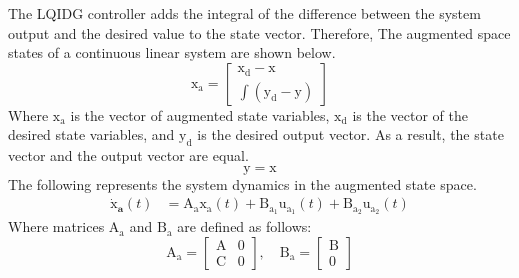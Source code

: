 \documentclass[conference]{IEEEtran}
\begin{document}
The LQIDG controller adds the integral of the difference between the system output and the desired value to the state vector.
Therefore, The augmented space states of a continuous linear system are shown below.
\begin{equation}\label{lqidg_x}
    \boldsymbol{\mathrm{x_a}} = \begin{bmatrix}
        \boldsymbol{\mathrm{x_d}} - \boldsymbol{\mathrm{x}}\\
        \displaystyle \int (\boldsymbol{\mathrm{y_d}} - \boldsymbol{\mathrm{y}})
    \end{bmatrix}
\end{equation}
Where $\boldsymbol{\mathrm{x_a}}$ is the vector of augmented state variables, $\boldsymbol{\mathrm{x_d}}$ is the vector of the desired state variables, and $\boldsymbol{\mathrm{y_d}}$ is the desired output vector.
As a result, the state vector and the output vector are equal.
\begin{equation}
	\boldsymbol{\mathrm{y}} = \boldsymbol{\mathrm{x}}
\end{equation}
The following represents the system dynamics in the augmented state space.
\begin{equation}\label{systemlqidg}
	\begin{split}
		\boldsymbol{\dot{\mathrm{x}}_a}(t) &= \boldsymbol{\mathrm{A_ax_a}}(t) + \boldsymbol{\mathrm{B_{{a_1}}u_{a_1}}}(t) + \boldsymbol{\mathrm{B_{{a_2}}u_{a_2}}}(t)%
	\end{split}
\end{equation}
Where matrices $\boldsymbol{\mathrm{A_a}}$ and $\boldsymbol{\mathrm{B_a}}$ are defined as follows:
\begin{equation}
	\boldsymbol{\mathrm{A_a}} = \begin{bmatrix}
		\boldsymbol{\mathrm{A}} &0\\
		\boldsymbol{\mathrm{C}} & 0
	\end{bmatrix}
, \quad
	\boldsymbol{\mathrm{B_a}} = \begin{bmatrix}
		\boldsymbol{\mathrm{B}}\\
		0
	\end{bmatrix}
\end{equation}
\end{document}
